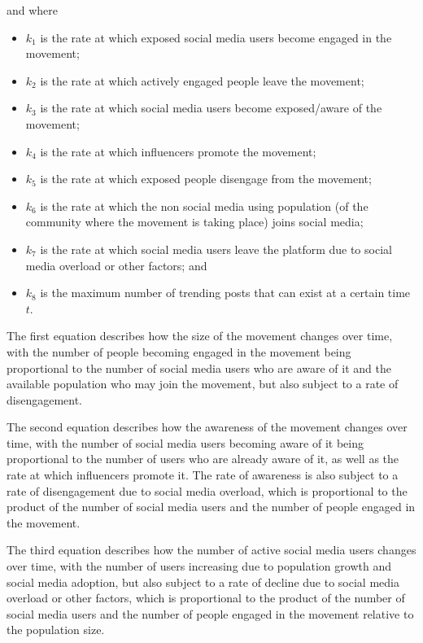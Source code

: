 \documentclass{article}
\begin{document}
    and where
    \begin{itemize}
        \item $k_1$ is the rate at which exposed social media users become engaged in the movement;
        \item $k_2$ is the rate at which actively engaged people leave the movement;
        \item $k_3$ is the rate at which social media users become exposed/aware of the movement;
        \item $k_4$ is the rate at which influencers promote the movement;
        \item $k_5$ is the rate at which exposed people disengage from the movement;
        \item $k_6$ is the rate at which the non social media using population (of the community where the movement is taking place) joins social media;
        \item $k_7$ is the rate at which social media users leave the platform due to social media overload or other factors; and
        \item $k_8$ is the maximum number of trending posts that can exist at a certain time $t$.
    \end{itemize}
    
    The first equation describes how the size of the movement changes over time, with the number of people becoming engaged in the movement being proportional to the number of social media users who are aware of it and the available population who may join the movement, but also subject to a rate of disengagement. 
    
	The second equation describes how the awareness of the movement changes over time, with the number of social media users becoming aware of it being proportional to the number of users who are already aware of it, as well as the rate at which influencers promote it. The rate of awareness is also subject to a rate of disengagement due to social media overload, which is proportional to the product of the number of social media users and the number of people engaged in the movement. 
 
	The third equation describes how the number of active social media users changes over time, with the number of users increasing due to population growth and social media adoption, but also subject to a rate of decline due to social media overload or other factors, which is proportional to the product of the number of social media users and the number of people engaged in the movement relative to the population size. 
 
\end{document}
